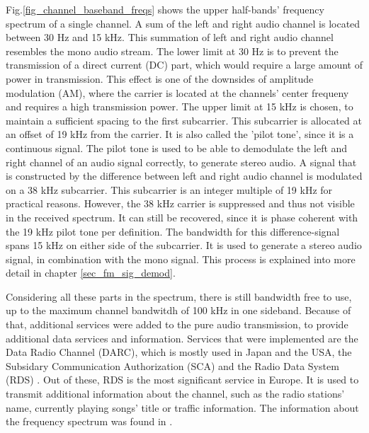 \documentclass[conference]{IEEEtran}
\begin{document}
    Fig.\ref{fig_channel_baseband_freqs} shows the upper half-bands' frequency spectrum of a single channel.
    A sum of the left and right audio channel is located between 30 Hz and 15 kHz.
    This summation of left and right audio channel resembles the mono audio stream.
    The lower limit at 30 Hz is to prevent the transmission of a direct current (DC) part, which would require a large amount of power in transmission. This effect is one of the downsides of amplitude modulation (AM), where the carrier is located at the channels' center frequeny and requires a high transmission power. %
    The upper limit at 15 kHz is chosen, to maintain a sufficient spacing to the first subcarrier.
    This subcarrier is allocated at an offset of 19 kHz from the carrier.
    It is also called the 'pilot tone', since it is a continuous signal.
    The pilot tone is used to be able to demodulate the left and right channel of an audio signal correctly, to generate stereo audio.
    A signal that is constructed by the difference between left and right audio channel is modulated on a 38 kHz subcarrier.
    This subcarrier is an integer multiple of 19 kHz for practical reasons.
    However, the 38 kHz carrier is suppressed and thus not visible in the received spectrum.
    It can still be recovered, since it is phase coherent with the 19 kHz pilot tone per definition.
    The bandwidth for this difference-signal spans 15 kHz on either side of the subcarrier.
    It is used to generate a stereo audio signal, in combination with the mono signal.
    This process is explained into more detail in chapter \ref{sec_fm_sig_demod}.

    Considering all these parts in the spectrum, there is still bandwidth free to use, up to the maximum channel bandwitdh of 100 kHz in one sideband.
    Because of that, additional services were added to the pure audio transmission, to provide additional data services and information.
    Services that were implemented are the Data Radio Channel (DARC), which is mostly used in Japan and the USA, the Subsidary Communication Authorization (SCA) and the Radio Data System (RDS) \cite{ref_rohde_u_schwarz}.
    Out of these, RDS is the most significant service in Europe.
    It is used to transmit additional information about the channel, such as the radio stations' name, currently playing songs' title or traffic information.
    The information about the frequency spectrum was found in \cite{ref_fm_broadcast_tutorial_and_basics}.
\end{document}
